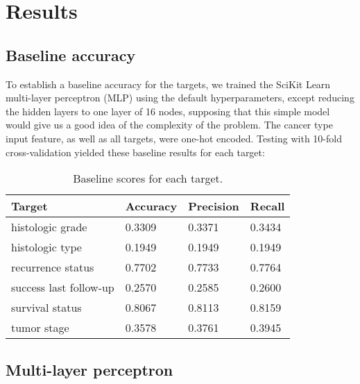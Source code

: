\documentclass{article}
\begin{document}
\section{Results}

\subsection{Baseline accuracy}

To establish a baseline accuracy for the targets, we trained the SciKit Learn multi-layer perceptron (MLP) using the default hyperparameters, except reducing the hidden layers to one layer of 16 nodes, supposing that this simple model would give us a good idea of the complexity of the problem. The cancer type input feature, as well as all targets, were one-hot encoded. Testing with 10-fold cross-validation yielded these baseline results for each target:

\bigskip

\begin{table}[H]
\begin{center}
\begin{tabular}{ *{4}{l} }
    \multicolumn{1}{p{1.5cm}}{\raggedright Target} &  
    \multicolumn{1}{p{1.5cm}}{\raggedright Accuracy} &  
    \multicolumn{1}{p{1.5cm}}{\raggedright Precision} &  
    \multicolumn{1}{p{1.5cm}}{\raggedright Recall} \\ \hline \hline
histologic grade       &         0.3309 &          0.3371 &       0.3434 \\ \hline
histologic type        &         0.1949 &          0.1949 &       0.1949 \\ \hline
recurrence status      &         0.7702 &          0.7733 &       0.7764 \\ \hline
success last follow-up &         0.2570 &          0.2585 &       0.2600 \\ \hline
survival status        &         0.8067 &          0.8113 &       0.8159 \\ \hline
tumor stage            &         0.3578 &          0.3761 &       0.3945 \\ \hline
\end{tabular}
\caption{Baseline scores for each target.}
\end{center}
\end{table}

\subsection{Multi-layer perceptron}
\end{document}
